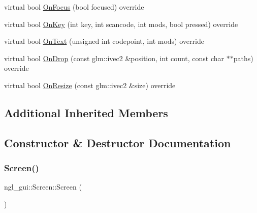 \begin{DoxyCompactItemize}
virtual bool \mbox{\hyperlink{classngl__gui_1_1_screen_adaf24551542f162fa02e79ad7f4c9b8d}{On\+Focus}} (bool focused) override
\item 
virtual bool \mbox{\hyperlink{classngl__gui_1_1_screen_a2f5b915a62f13cbac4d3b838f355c6c7}{On\+Key}} (int key, int scancode, int mods, bool pressed) override
\item 
virtual bool \mbox{\hyperlink{classngl__gui_1_1_screen_ab80fea511f7af195b1f5352c9a04a86e}{On\+Text}} (unsigned int codepoint, int mods) override
\item 
virtual bool \mbox{\hyperlink{classngl__gui_1_1_screen_a72094220b06b22f1a301295ce4bcfed6}{On\+Drop}} (const glm\+::ivec2 \&position, int count, const char $\ast$$\ast$paths) override
\item 
virtual bool \mbox{\hyperlink{classngl__gui_1_1_screen_aa217aa70046107e5626e865c3bd4b385}{On\+Resize}} (const glm\+::ivec2 \&size) override
\end{DoxyCompactItemize}
\subsection*{Additional Inherited Members}


\subsection{Constructor \& Destructor Documentation}
\mbox{\label{classngl__gui_1_1_screen_ad1d0d6b993208a4cf33f2c93821ab535}} 
\subsubsection{\texorpdfstring{Screen()}{Screen()}}
{\footnotesize\ttfamily ngl\+\_\+gui\+::\+Screen\+::\+Screen (\begin{DoxyParamCaption}{ }\end{DoxyParamCaption})\hspace{0.3cm}{\ttfamily [explicit]}}

\mbox{\label{classngl__gui_1_1_screen_a6ce1083856f0014ac80e3e0c1f01317c}} 
